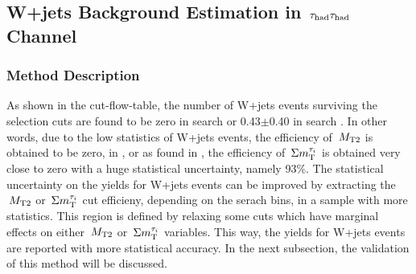 \subsection{\texorpdfstring{W+jets Background Estimation in $\,\tau_{\rm had}\tau_{\rm had}$ Channel}{W+jets Background Estimation in tau-tau Channel}}
\subsubsection{Method Description}
As shown in the cut-flow-table, the number of W+jets events surviving the selection cuts are found to be zero in search \binone or 0.43$\pm$0.40 in search \bintwo. In other words, due to the low statistics of W+jets events, the efficiency of $\,{M_{\rm T2}}$ is obtained to be zero, in \binone, or as found in \bintwo, the efficiency of $\,\Sigma m_{\rm T}^{\tau_i}$ is obtained very close to zero with a huge statistical uncertainty, namely 93\%. The statistical uncertainty on the yields for W+jets events can be improved by extracting the $\,{M_{\rm T2}}$ or $\,\Sigma m_{\rm T}^{\tau_i}$ cut efficieny, depending on the serach bins, in a sample with more statistics. This region is defined by relaxing some cuts which have marginal effects on either $\,{M_{\rm T2}}$ or $\,\Sigma m_{\rm T}^{\tau_i}$ variables. This way, the yields for W+jets events are reported with more statistical accuracy. In the next subsection, the validation of this method will be discussed.\\

